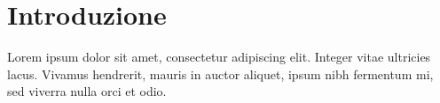 \chapter{Introduzione}
Lorem ipsum dolor sit amet, consectetur adipiscing elit. Integer vitae
ultricies lacus. Vivamus hendrerit, mauris in auctor aliquet, ipsum nibh
fermentum mi, sed viverra nulla orci et odio.
